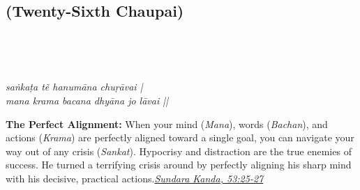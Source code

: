
\newpage

\subsection*{ (Twenty-Sixth Chaupai)}

\begin{minipage}[t]{0.55\textwidth}
\vspace{0pt}

{\large \linespread{1.5}\selectfont
{}\\
\par}

\vspace{0.5em}

{\large \linespread{1.5}\selectfont
{}\\
\par}

\vspace{0.5em}

{\large \linespread{1.3}\selectfont
\textit{saṅkaṭa tẽ hanumāna chuṛāvai |}\\
\textit{mana krama bacana dhyāna jo lāvai ||}
\par}
\end{minipage}%
\hfill
\begin{minipage}[t]{0.42\textwidth}
\vspace{0pt}
\begin{tcolorbox}[anchorbox]
\textbf{The Perfect Alignment:} When your mind (\textit{Mana}), words (\textit{Bachan}), and actions (\textit{Krama}) are perfectly aligned toward a single goal, you can navigate your way out of any crisis (\textit{Sankat}). Hypocrisy and distraction are the true enemies of success.
\vspace{0.5em}\newline He turned a terrifying crisis around by perfectly aligning his sharp mind with his decisive, practical actions.\newline\null\hfill\href{https://www.valmiki.iitk.ac.in/sloka?field_kanda_tid=5&language=dv&field_sarga_value=53}{\textit{Sundara Kanda, 53:25-27}}
\end{tcolorbox}
\end{minipage}

